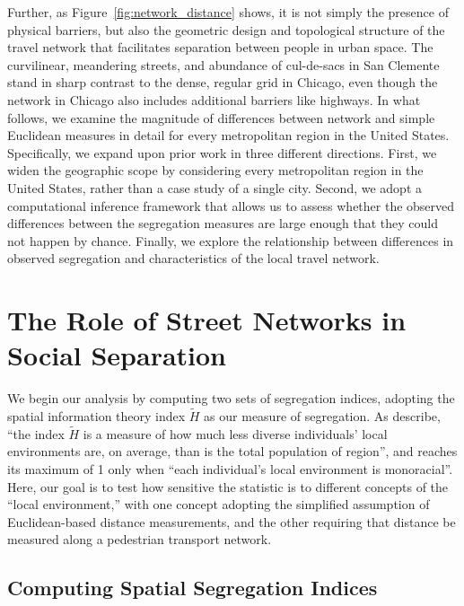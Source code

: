 \documentclass[
  10pt,
]{article}
\begin{document}
Further, as Figure~\ref{fig:network_distance} shows, it is not simply
the presence of physical barriers, but also the geometric design and
topological structure of the travel network that facilitates separation
between people in urban space. The curvilinear, meandering streets, and
abundance of cul-de-sacs in San Clemente stand in sharp contrast to the
dense, regular grid in Chicago, even though the network in Chicago also
includes additional barriers like highways. In what follows, we examine
the magnitude of differences between network and simple Euclidean
measures in detail for every metropolitan region in the United States.
Specifically, we expand upon prior work in three different directions.
First, we widen the geographic scope by considering every metropolitan
region in the United States, rather than a case study of a single city.
Second, we adopt a computational inference framework that allows us to
assess whether the observed differences between the segregation measures
are large enough that they could not happen by chance. Finally, we
explore the relationship between differences in observed segregation and
characteristics of the local travel network.

\hypertarget{the-role-of-street-networks-in-social-separation}{%
\section{The Role of Street Networks in Social
Separation}\label{the-role-of-street-networks-in-social-separation}}

We begin our analysis by computing two sets of segregation indices,
adopting the spatial information theory index \(\tilde{H}\) as our
measure of segregation. As \citet[p.~512]{reardon2008GeographicScale}
describe, ``the index \(\tilde{H}\) is a measure of how much less
diverse individuals' local environments are, on average, than is the
total population of region'', and reaches its maximum of 1 only when
``each individual's local environment is monoracial''. Here, our goal is
to test how sensitive the statistic is to different concepts of the
``local environment,'' with one concept adopting the simplified
assumption of Euclidean-based distance measurements, and the other
requiring that distance be measured along a pedestrian transport
network.

\hypertarget{computing-spatial-segregation-indices}{%
\subsection{Computing Spatial Segregation
Indices}\label{computing-spatial-segregation-indices}}
\end{document}
